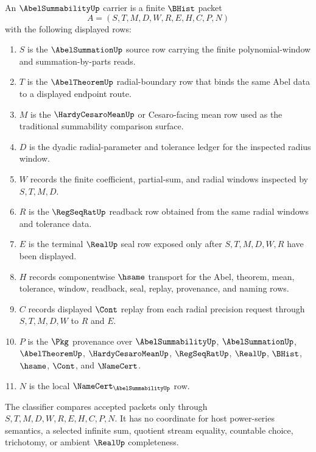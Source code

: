 \begin{definition}
\label{def:abel-summability-carrier}
An $\AbelSummabilityUp$ carrier is a finite $\BHist$ packet
$$
A=(S,T,M,D,W,R,E,H,C,P,N)
$$
with the following displayed rows:
\begin{enumerate}
\item $S$ is the $\AbelSummationUp$ source row carrying the finite polynomial-window and summation-by-parts reads.
\item $T$ is the $\AbelTheoremUp$ radial-boundary row that binds the same Abel data to a displayed endpoint route.
\item $M$ is the $\HardyCesaroMeanUp$ or Cesaro-facing mean row used as the traditional summability comparison surface.
\item $D$ is the dyadic radial-parameter and tolerance ledger for the inspected radius window.
\item $W$ records the finite coefficient, partial-sum, and radial windows inspected by $S,T,M,D$.
\item $R$ is the $\RegSeqRatUp$ readback row obtained from the same radial windows and tolerance data.
\item $E$ is the terminal $\RealUp$ seal row exposed only after $S,T,M,D,W,R$ have been displayed.
\item $H$ records componentwise $\hsame$ transport for the Abel, theorem, mean, tolerance, window, readback, seal, replay, provenance, and naming rows.
\item $C$ records displayed $\Cont$ replay from each radial precision request through $S,T,M,D,W$ to $R$ and $E$.
\item $P$ is the $\Pkg$ provenance over $\AbelSummabilityUp$, $\AbelSummationUp$, $\AbelTheoremUp$, $\HardyCesaroMeanUp$, $\RegSeqRatUp$, $\RealUp$, $\BHist$, $\hsame$, $\Cont$, and $\NameCert$.
\item $N$ is the local $\NameCert_{\AbelSummabilityUp}$ row.
\end{enumerate}
The classifier compares accepted packets only through $S,T,M,D,W,R,E,H,C,P,N$. It has no coordinate for host power-series semantics, a selected infinite sum, quotient stream equality, countable choice, trichotomy, or ambient $\RealUp$ completeness.
\end{definition}

